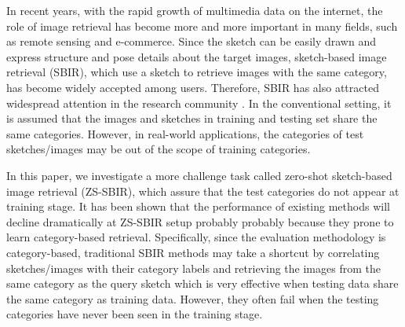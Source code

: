 \documentclass[10pt,twocolumn,letterpaper]{article}
\begin{document}
In recent years, with the rapid growth of multimedia data on the internet, the role of image retrieval has become more and more important in many fields, such as remote sensing and e-commerce. 
Since the sketch can be easily drawn and express structure and pose details about the target images, sketch-based image retrieval (SBIR), which use a sketch to retrieve images with the same category, has become widely accepted among users. 
Therefore, SBIR has also attracted widespread attention in the research community \cite{del1997visual, cao2010mindfinder, eitz2010evaluation, eitz2010sketch, cao2011edgel, hu2011bag, zhou2012sketch, hu2013performance, cao2013sym, saavedra2014sketch, parui2014similarity, james2014reenact, wang2015sketch, saavedra2015sketch, li2016fine, yu2016sketch, qi2016sketch, sangkloy2016sketchy, lu2018learning}. 
In the conventional setting, it is assumed that the images and sketches in training and testing set share the same categories.
However, in real-world applications, the categories of test sketches/images may be out of the scope of training categories.

In this paper, we investigate a more challenge task called zero-shot sketch-based image retrieval (ZS-SBIR), which assure that the test categories do not appear at training stage. 
It has been shown that the performance of existing methods will decline dramatically at ZS-SBIR setup \cite{yelamarthi2018zero} probably probably because they prone to learn category-based retrieval.
Specifically, since the evaluation methodology is category-based, traditional SBIR methods may take a shortcut by correlating sketches/images with their category labels and retrieving the images from the same category as the query sketch \cite{yelamarthi2018zero} which is very effective when testing data share the same category as training data. 
However, they often fail when the testing categories have never been seen in the training stage.
\end{document}
